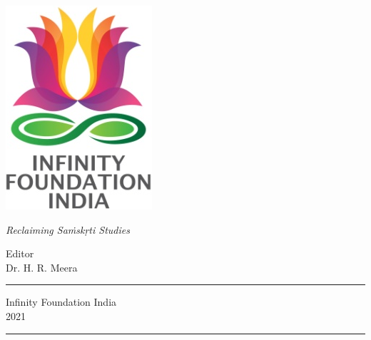 \thispagestyle{empty}
\begin{center}
\includegraphics[scale=0.3]{images/logo.png}
\bigskip

{\fontsize{10}{14}\selectfont\sl
Reclaiming Saṁskṛti Studies
}

\bigskip
\end{center}
\medskip

\begin{center}
{\fontsize{20}{24}\selectfont {Karnāṭaka Śāstrīya Saṅgīta}}

\small

{\fontsize{16}{17}\selectfont {Past, Present, and Future}}

\vfill


\bigskip
 
{\fontsize{14}{18}\selectfont 
Editor\\[3pt]
Dr. H. R. Meera}\par
\vfill

\rule{5cm}{1pt}

{\fontsize{12}{14}\selectfont
Infinity Foundation India\\[4pt]
2021}

\rule{5cm}{1pt}
\end{center}




